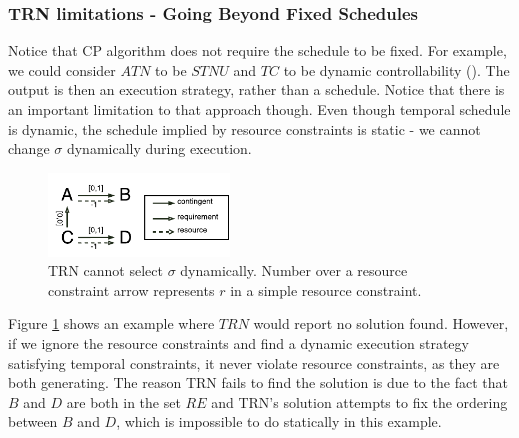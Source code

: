 \subsubsection{TRN limitations - Going Beyond Fixed Schedules}
Notice that CP algorithm does not require the schedule to be fixed. For example, we could consider $ATN$ to be $STNU$ and $TC$ to be dynamic controllability (\cite{vidal1996dealing}). The output is then an execution strategy, rather than a schedule. Notice that there is an important limitation to that approach though. Even though temporal schedule is dynamic, the schedule implied by resource constraints is static - we cannot change $\sigma$ dynamically during execution.

\begin{figure}[H]
\begin{center}
\includegraphics[width=0.43\textwidth,trim={0.23cm 0.23cm 0.00cm 0.37cm},clip]{stnu_counter}
\caption{TRN cannot select $\sigma$ dynamically. Number over a resource constraint arrow represents $r$ in a simple resource constraint.}
\label{fig:stnu_counter}
\end{center}
\end{figure}

Figure \ref{fig:stnu_counter} shows an example where $TRN$ would report no solution found. However, if we ignore the resource constraints and find a dynamic execution strategy satisfying temporal constraints, it never violate resource constraints, as they are both generating. The reason TRN fails to find the solution is due to the fact that $B$ and $D$ are both in the set $RE$ and TRN's solution attempts to fix the ordering between $B$ and $D$, which is impossible to do statically in this example.


